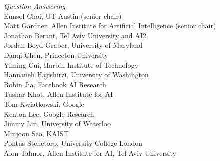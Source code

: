 \emph{Question Answering} \\
\hspace*{0.2in} Eunsol Choi, UT Austin (senior chair)\\
\hspace*{0.2in} Matt Gardner, Allen Institute for Artificial Intelligence (senior chair)\\
\hspace*{0.2in} Jonathan Berant, Tel Aviv University and AI2\\
\hspace*{0.2in} Jordan Boyd-Graber, University of Maryland\\
\hspace*{0.2in} Danqi Chen, Princeton University\\
\hspace*{0.2in} Yiming Cui, Harbin Institute of Technology\\
\hspace*{0.2in} Hannaneh Hajishirzi, University of Washington\\
\hspace*{0.2in} Robin Jia, Facebook AI Research\\
\hspace*{0.2in} Tushar Khot, Allen Institute for AI\\
\hspace*{0.2in} Tom Kwiatkowski, Google\\
\hspace*{0.2in} Kenton Lee, Google Research\\
\hspace*{0.2in} Jimmy Lin, University of Waterloo\\
\hspace*{0.2in} Minjoon Seo, KAIST\\
\hspace*{0.2in} Pontus Stenetorp, University College London\\
\hspace*{0.2in} Alon Talmor, Allen Institute for AI, Tel-Aviv University\\

